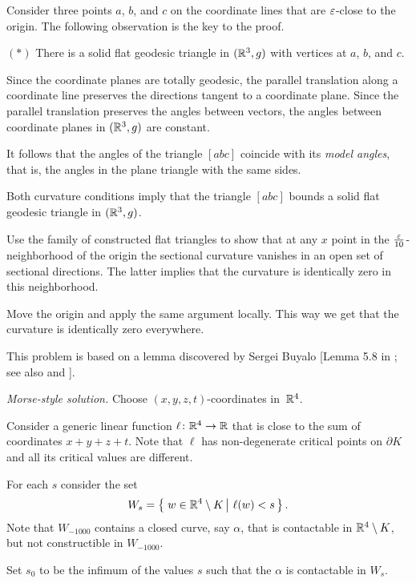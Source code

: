 Consider three points $a$, $b$, and $c$ on the coordinate lines that are $\varepsilon$-close 
to the origin.
The following observation is the key to the proof.

\begin{cl}{$({*})$}
There is a solid flat geodesic triangle in $(\mathbb{R}^3,g)$ with vertices at $a$, $b$, and $c$.
\end{cl}

Since the coordinate planes are totally geodesic, 
the parallel translation along a coordinate line preserves the directions tangent to a coordinate plane.
Since the parallel translation preserves the angles between vectors, the angles between coordinate planes in $(\mathbb{R}^3,g)$ are constant.

It follows that the angles of the triangle $[abc]$ coincide with its \emph{model angles},
that is, the angles in the plane triangle with the same sides.

Both curvature conditions imply that the triangle $[abc]$ bounds a solid flat geodesic triangle in   $(\mathbb{R}^3,g)$.

Use the family of constructed flat triangles to show that at any $x$ point in the $\tfrac{\varepsilon}{10}$-neighborhood of the origin the sectional curvature vanishes in an open set of sectional directions.
The latter implies that the curvature is identically zero 
in this neighborhood.

Move the origin and apply the same argument locally.
This way we get that the curvature is identically zero everywhere.
\qeds

This problem is based on a lemma discovered by Sergei Buyalo [Lemma 5.8 in ; see also  and ].

\textit{Morse-style solution.}
Choose $(x,y,z,t)$-coordinates in~$\mathbb{R}^4$.

Consider a generic linear function $\ell\colon\mathbb{R}^4\to\mathbb{R}$ that is close to the sum of coordinates $x+y+z+t$.
Note that $\ell$
has non-degenerate critical points on $\partial K$ and all its critical values are different.

For each $s$ consider the set 
$$W_s=\set{w\in \RR^4\setminus K}{\ell(w)<s}.$$
Note that $W_{-1000}$ contains a closed curve, say $\alpha$, that is contactable in $\mathbb{R}^4\setminus K$, but not constructible in $W_{-1000}$.

Set $s_0$ to be the infimum of the values $s$ such that
the $\alpha$ is contactable in $W_s$.

